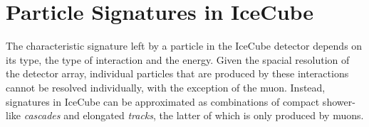 \section{Particle Signatures in IceCube}

The characteristic signature left by a particle in the IceCube detector depends on its type, the type of interaction and the energy. Given the spacial resolution of the detector array, individual particles that are produced by these interactions cannot be resolved individually, with the exception of the muon. Instead, signatures in IceCube can be approximated as combinations of compact shower-like \emph{cascades} and elongated \emph{tracks}, the latter of which is only produced by muons. 